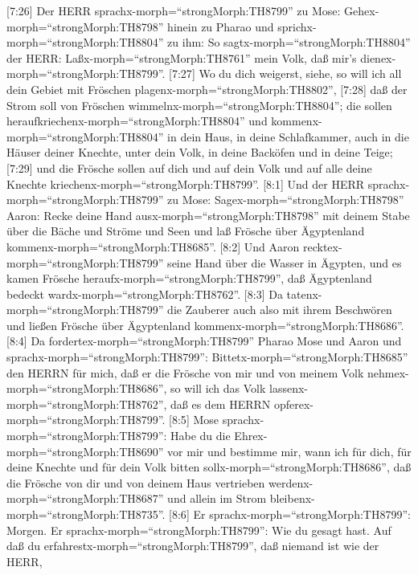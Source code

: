  {[}7:26{]} Der HERR sprachx-morph=``strongMorph:TH8799'' zu
Mose: Gehex-morph=``strongMorph:TH8798'' hinein zu Pharao und
sprichx-morph=``strongMorph:TH8804'' zu ihm: So
sagtx-morph=``strongMorph:TH8804'' der HERR:
Laßx-morph=``strongMorph:TH8761'' mein Volk, daß mir's
dienex-morph=``strongMorph:TH8799''.  {[}7:27{]} Wo du dich
weigerst, siehe, so will ich all dein Gebiet mit Fröschen
plagenx-morph=``strongMorph:TH8802'',  {[}7:28{]} daß der
Strom soll von Fröschen wimmelnx-morph=``strongMorph:TH8804''; die
sollen heraufkriechenx-morph=``strongMorph:TH8804'' und
kommenx-morph=``strongMorph:TH8804'' in dein Haus, in deine
Schlafkammer, auch in die Häuser deiner Knechte, unter dein Volk, in
deine Backöfen und in deine Teige;  {[}7:29{]} und die
Frösche sollen auf dich und auf dein Volk und auf alle deine Knechte
kriechenx-morph=``strongMorph:TH8799''.  {[}8:1{]} Und der
HERR sprachx-morph=``strongMorph:TH8799'' zu Mose:
Sagex-morph=``strongMorph:TH8798'' Aaron: Recke deine Hand
ausx-morph=``strongMorph:TH8798'' mit deinem Stabe über die Bäche und
Ströme und Seen und laß Frösche über Ägyptenland
kommenx-morph=``strongMorph:TH8685''.  {[}8:2{]} Und Aaron
recktex-morph=``strongMorph:TH8799'' seine Hand über die Wasser in
Ägypten, und es kamen Frösche heraufx-morph=``strongMorph:TH8799'', daß
Ägyptenland bedeckt wardx-morph=``strongMorph:TH8762''. 
{[}8:3{]} Da tatenx-morph=``strongMorph:TH8799'' die Zauberer auch also
mit ihrem Beschwören und ließen Frösche über Ägyptenland
kommenx-morph=``strongMorph:TH8686''.  {[}8:4{]} Da
fordertex-morph=``strongMorph:TH8799'' Pharao Mose und Aaron und
sprachx-morph=``strongMorph:TH8799'':
Bittetx-morph=``strongMorph:TH8685'' den HERRN für mich, daß er die
Frösche von mir und von meinem Volk nehmex-morph=``strongMorph:TH8686'',
so will ich das Volk lassenx-morph=``strongMorph:TH8762'', daß es dem
HERRN opferex-morph=``strongMorph:TH8799''.  {[}8:5{]} Mose
sprachx-morph=``strongMorph:TH8799'': Habe du die
Ehrex-morph=``strongMorph:TH8690'' vor mir und bestimme mir, wann ich
für dich, für deine Knechte und für dein Volk bitten
sollx-morph=``strongMorph:TH8686'', daß die Frösche von dir und von
deinem Haus vertrieben werdenx-morph=``strongMorph:TH8687'' und allein
im Strom bleibenx-morph=``strongMorph:TH8735''.  {[}8:6{]}
Er sprachx-morph=``strongMorph:TH8799'': Morgen. Er
sprachx-morph=``strongMorph:TH8799'': Wie du gesagt hast. Auf daß du
erfahrestx-morph=``strongMorph:TH8799'', daß niemand ist wie der HERR,
